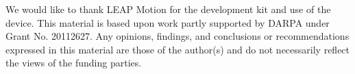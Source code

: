 We would like to thank LEAP Motion for the development kit and use of the device. This material is based upon work partly supported by DARPA under Grant No. 20112627. Any opinions, findings, and conclusions or recommendations expressed in this material are those of the author(s) and do not necessarily reflect the views of the funding parties.

